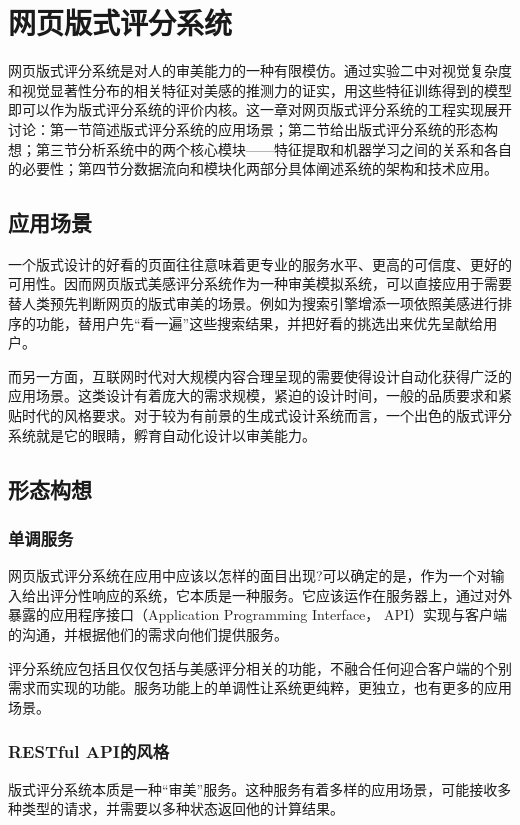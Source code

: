 \chapter{网页版式评分系统}
\label{chap:application}

网页版式评分系统是对人的审美能力的一种有限模仿。通过实验二中对视觉复杂度和视觉显著性分布的相关特征对美感的推测力的证实，用这些特征训练得到的模型即可以作为版式评分系统的评价内核。这一章对网页版式评分系统的工程实现展开讨论：第一节简述版式评分系统的应用场景；第二节给出版式评分系统的形态构想；第三节分析系统中的两个核心模块——特征提取和机器学习之间的关系和各自的必要性；第四节分数据流向和模块化两部分具体阐述系统的架构和技术应用。

\section{应用场景}
一个版式设计的好看的页面往往意味着更专业的服务水平、更高的可信度、更好的可用性。因而网页版式美感评分系统作为一种审美模拟系统，可以直接应用于需要替人类预先判断网页的版式审美的场景。例如为搜索引擎增添一项依照美感进行排序的功能，替用户先“看一遍”这些搜索结果，并把好看的挑选出来优先呈献给用户。

而另一方面，互联网时代对大规模内容合理呈现的需要使得设计自动化获得广泛的应用场景。这类设计有着庞大的需求规模，紧迫的设计时间，一般的品质要求和紧贴时代的风格要求。对于较为有前景的生成式设计系统而言，一个出色的版式评分系统就是它的眼睛，孵育自动化设计以审美能力。

\section{形态构想}
\subsection{单调服务}
网页版式评分系统在应用中应该以怎样的面目出现?可以确定的是，作为一个对输入给出评分性响应的系统，它本质是一种服务。它应该运作在服务器上，通过对外暴露的应用程序接口（Application Programming Interface， API）实现与客户端的沟通，并根据他们的需求向他们提供服务。

评分系统应包括且仅仅包括与美感评分相关的功能，不融合任何迎合客户端的个别需求而实现的功能。服务功能上的单调性让系统更纯粹，更独立，也有更多的应用场景。

\subsection{RESTful API的风格}
版式评分系统本质是一种“审美”服务。这种服务有着多样的应用场景，可能接收多种类型的请求，并需要以多种状态返回他的计算结果。

